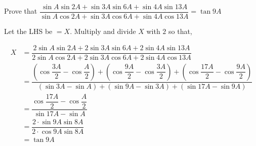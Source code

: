 
%
%
%
%
% 
% 

\question Prove that $\dfrac{\sin A\sin 2A + \sin 3A\sin 6A + \sin 4A\sin 13A}
{\sin A\cos 2A + \sin 3A\cos 6A + \sin 4A\cos 13A} = \tan 9A$

\insertQR{}

\ifprintanswers
\fi 

\begin{solution}
   Let the LHS be $= X$. Multiply and divide $X$ with $2$ so that, 
   \begin{fullwidth}
   	  \begin{align}
   	      X &= \dfrac{2\sin A\sin 2A + 2\sin 3A\sin 6A + 2\sin 4A\sin 13A}
{2\sin A\cos 2A + 2\sin 3A\cos 6A + 2\sin 4A\cos 13A} \\
            &= \dfrac{(\cos\dfrac{3A}{2} - \cos\dfrac{A}{2}) + 
            (\cos\dfrac{9A}{2} - \cos\dfrac{3A}{2}) + 
            (\cos\dfrac{17A}{2} - \cos\dfrac{9A}{2})}
                     {(\sin 3A - \sin A) + 
                     (\sin 9A - \sin 3A) + 
                     (\sin 17A - \sin 9A)} \\
            &= \dfrac{\cos\dfrac{17A}{2} - \cos\dfrac{A}{2}}{\sin 17A - \sin A} \\
            &= \dfrac{2\cdot\sin 9A\sin 8A}{2\cdot\cos 9A\sin 8A} \\
            &= \tan 9A
   	  \end{align}
   \end{fullwidth}
\end{solution}

